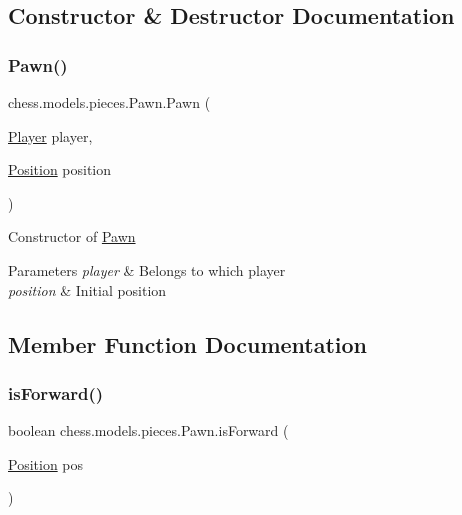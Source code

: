 \subsection{Constructor \& Destructor Documentation}
\mbox{\label{classchess_1_1models_1_1pieces_1_1_pawn_aa62632674360fd0518f583bf1477b8c1}} 
\subsubsection{\texorpdfstring{Pawn()}{Pawn()}}
{\footnotesize\ttfamily chess.\+models.\+pieces.\+Pawn.\+Pawn (\begin{DoxyParamCaption}\item[{\mbox{\hyperlink{enumchess_1_1models_1_1enums_1_1_player}{Player}}}]{player,  }\item[{\mbox{\hyperlink{classchess_1_1models_1_1_position}{Position}}}]{position }\end{DoxyParamCaption})}

Constructor of \mbox{\hyperlink{classchess_1_1models_1_1pieces_1_1_pawn}{Pawn}}


\begin{DoxyParams}{Parameters}
{\em player} & Belongs to which player \\
\hline
{\em position} & Initial position \\
\hline
\end{DoxyParams}


\subsection{Member Function Documentation}
\mbox{\label{classchess_1_1models_1_1pieces_1_1_pawn_a80055e2b99a160f4de32644423460a6f}} 
\subsubsection{\texorpdfstring{is\+Forward()}{isForward()}}
{\footnotesize\ttfamily boolean chess.\+models.\+pieces.\+Pawn.\+is\+Forward (\begin{DoxyParamCaption}\item[{\mbox{\hyperlink{classchess_1_1models_1_1_position}{Position}}}]{pos }\end{DoxyParamCaption})}

